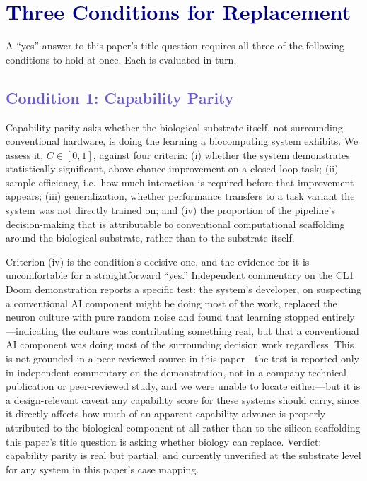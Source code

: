 \documentclass[journal]{IEEEtran}
\begin{document}
\section{\textcolor{darkblue}{Three Conditions for Replacement}}

A ``yes'' answer to this paper's title question requires all three of the following
conditions to hold at once. Each is evaluated in turn.

\subsection{\textcolor{slateblue}{Condition 1: Capability Parity}}

Capability parity asks whether the biological substrate itself, not surrounding
conventional hardware, is doing the learning a biocomputing system exhibits. We
assess it, $C \in [0,1]$, against four criteria: (i) whether the system demonstrates
statistically significant, above-chance improvement on a closed-loop task; (ii)
sample efficiency, i.e.\ how much interaction is required before that improvement
appears; (iii) generalization, whether performance transfers to a task variant the
system was not directly trained on; and (iv) the proportion of the pipeline's
decision-making that is attributable to conventional computational scaffolding
around the biological substrate, rather than to the substrate itself.

Criterion (iv) is the condition's decisive one, and the evidence for it is
uncomfortable for a straightforward ``yes.'' Independent commentary on the CL1 Doom
demonstration reports a specific test: the system's developer, on suspecting a
conventional AI component might be doing most of the work, replaced the neuron
culture with pure random noise and found that learning stopped entirely
\cite{notready2026biocomputing}---indicating the culture was contributing something
real, but that a conventional AI component was doing most of the surrounding decision
work regardless. This is not grounded in a peer-reviewed source in this paper---the
test is reported only in independent commentary on the demonstration, not in a
company technical publication or peer-reviewed study, and we were unable to locate
either---but it is a design-relevant caveat any capability score for these systems
should carry, since it directly affects how much of an apparent capability advance is
properly attributed to the biological component at all rather than to the silicon
scaffolding this paper's title question is asking whether biology can replace.
Verdict: capability parity is real but partial, and currently unverified at the
substrate level for any system in this paper's case mapping.
\end{document}
